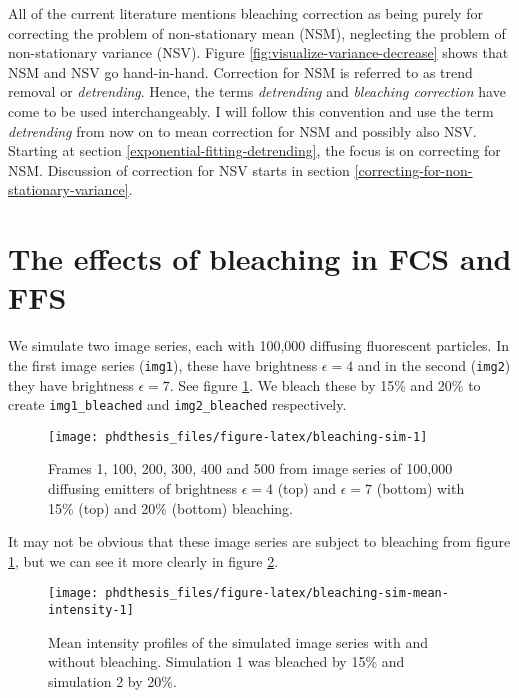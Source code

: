 \documentclass[12pt,]{book}
\theoremstyle{definition}
\theoremstyle{definition}
\theoremstyle{definition}
\theoremstyle{remark}
\let\BeginKnitrBlock\begin \let\EndKnitrBlock\end
\begin{document}
\BeginKnitrBlock{remark}
\iffalse{} {Remark. } \fi{}All of the current literature mentions
bleaching correction as being purely for correcting the problem of
non-stationary mean (NSM), neglecting the problem of non-stationary
variance (NSV). Figure \ref{fig:visualize-variance-decrease} shows that
NSM and NSV go hand-in-hand. Correction for NSM is referred to as trend
removal or \emph{detrending}. Hence, the terms \emph{detrending} and
\emph{bleaching correction} have come to be used interchangeably. I will
follow this convention and use the term \emph{detrending} from now on to
mean correction for NSM and possibly also NSV. Starting at section
\ref{exponential-fitting-detrending}, the focus is on correcting for
NSM. Discussion of correction for NSV starts in section
\ref{correcting-for-non-stationary-variance}.
\EndKnitrBlock{remark}

\section{The effects of bleaching in FCS and
FFS}\label{the-effects-of-bleaching-in-fcs-and-ffs}

We simulate two image series, each with 100,000 diffusing fluorescent
particles. In the first image series (\texttt{img1}), these have
brightness \(\epsilon = 4\) and in the second (\texttt{img2}) they have
brightness \(\epsilon = 7\). See figure \ref{fig:bleaching-sim}. We
bleach these by 15\% and 20\% to create \texttt{img1\_bleached} and
\texttt{img2\_bleached} respectively.






\begin{figure}

\texttt{[image: phdthesis\_files/figure-latex/bleaching-sim-1]} \hfill{}

\caption{Frames 1, 100, 200, 300, 400 and 500 from
image series of 100,000 diffusing emitters of brightness
\(\epsilon = 4\) (top) and \(\epsilon = 7\) (bottom) with 15\% (top) and
20\% (bottom) bleaching.}\label{fig:bleaching-sim}
\end{figure}

It may not be obvious that these image series are subject to bleaching
from figure \ref{fig:bleaching-sim}, but we can see it more clearly in
figure \ref{fig:bleaching-sim-mean-intensity}.





\begin{figure}

\texttt{[image: phdthesis\_files/figure-latex/bleaching-sim-mean-intensity-1]} \hfill{}

\caption{Mean intensity profiles of
the simulated image series with and without bleaching. Simulation 1 was
bleached by 15\% and simulation 2 by 20\%.}\label{fig:bleaching-sim-mean-intensity}
\end{figure}
\end{document}
